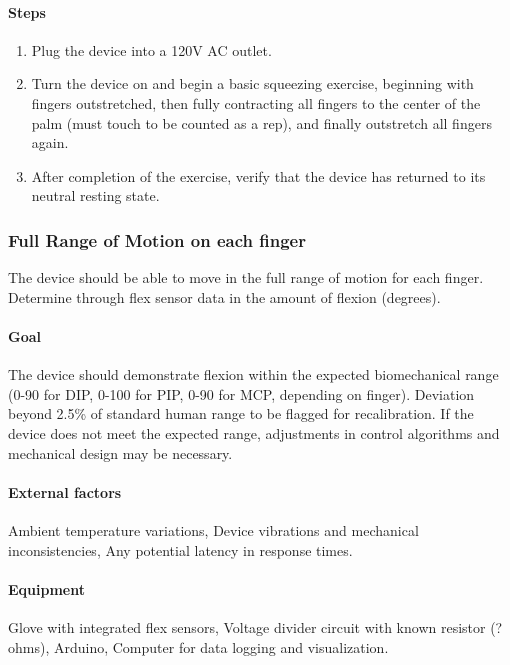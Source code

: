 \documentclass{article}
\begin{document}
\paragraph{Steps}
\begin{enumerate}
\item Plug the device into a 120V AC outlet.
\item Turn the device on and begin a basic squeezing exercise, beginning with fingers outstretched, then fully contracting all fingers to the center of the palm (must touch to be counted as a rep), and finally outstretch all fingers again.
\item After completion of the exercise, verify that the device has returned to its neutral resting state.
\end{enumerate}

\subsubsection{Full Range of Motion on each finger}
The device should be able to move in the full range of motion for each finger. Determine through flex sensor data in the amount of flexion (degrees).

\paragraph{Goal} The device should demonstrate flexion within the expected biomechanical range (0-90 for DIP, 0-100 for PIP, 0-90 for MCP, depending on finger). Deviation beyond 2.5\% of standard human range to be flagged for recalibration. If the device does not meet the expected range, adjustments in control algorithms and mechanical design may be necessary.

\paragraph{External factors} Ambient temperature variations, Device vibrations and mechanical inconsistencies, Any potential latency in response times.

\paragraph{Equipment} Glove with integrated flex sensors, Voltage divider circuit with known resistor (? ohms), Arduino, Computer for data logging and visualization.
\end{document}

